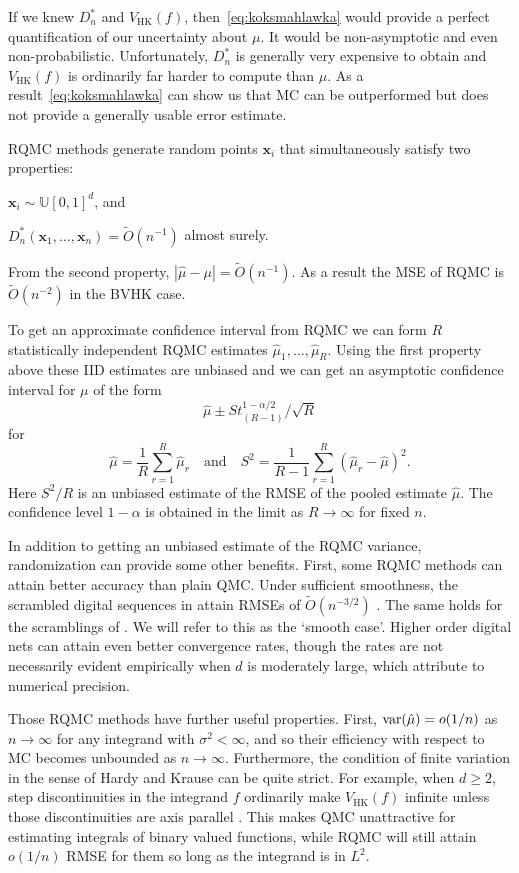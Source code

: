 \documentclass{article}
\renewcommand{\ge}{\geqslant}
\newcommand{\bsx}{\boldsymbol{x}}
\newcommand{\dunif}{\mathbb{U}}
\newcommand{\hk}{\mathrm{HK}}
\begin{document}
If we knew $D_n^*$ and $V_\hk(f)$, then~\eqref{eq:koksmahlawka} would provide a
perfect quantification of our uncertainty about $\mu$.
It would be non-asymptotic and even non-probabilistic.
Unfortunately, $D_n^*$ is generally very expensive
to obtain and $V_{\hk}(f)$ is ordinarily far harder
to compute than $\mu$. As a result~\eqref{eq:koksmahlawka}
can show us that MC can be outperformed but does
not provide a generally usable error estimate.

RQMC methods generate random points $\bsx_i$ that
simultaneously satisfy two properties:
\begin{compactenum}[\quad\bf1)]
\item $\bsx_i\sim\dunif[0,1]^d$, and
\item $D_n^*(\bsx_1,\dots,\bsx_n)=\tilde O(n^{-1})$ almost surely.
\end{compactenum}
From the second property, $|\hat\mu-\mu|=\tilde O(n^{-1})$.
As a result the MSE of RQMC is $\tilde O(n^{-2})$
in the BVHK case.

To get an approximate confidence interval from RQMC
we can form $R$ statistically independent RQMC estimates
$\hat\mu_1,\dots,\hat\mu_R$. Using the first property
above these IID estimates are unbiased and we can get
an asymptotic confidence interval for $\mu$ of the form
$$
\hat\mu \pm S t_{(R-1)}^{1-\alpha/2}/\sqrt{R}
$$
for
$$
\hat\mu = \frac1R\sum_{r=1}^R\hat\mu_r
\quad\text{and}\quad
S^2 = \frac1{R-1}\sum_{r=1}^R(\hat\mu_r-\hat\mu)^2.
$$
Here $S^2/R$ is an unbiased estimate of the RMSE
of the pooled estimate $\hat\mu$.
The confidence level $1-\alpha$ is obtained in
the limit as $R\to\infty$ \cite{naka:tuff:2024}
for fixed $n$.

In addition to getting an unbiased estimate of
the RQMC variance, randomization can provide
some other benefits.  First, some RQMC methods
can attain better accuracy than plain QMC.
Under sufficient smoothness, the scrambled  digital sequences
in \cite{Owe95} attain RMSEs of $\tilde O(n^{-3/2})$
\cite{Owe97,Owe08a}. The same holds for the scramblings
of \cite{Mat98}. We will refer to this as the `smooth case'.
Higher order digital nets \cite{Dic11a} can attain even
better convergence rates, though the rates are not
necessarily evident empirically when $d$ is moderately
large, which \cite{nuyens2010higher} attribute to numerical precision.

Those RQMC methods have further
useful properties.  First,  $\operatorname{var}(\hat\mu) = o(1/n)$ as $n\to\infty$
for any integrand with $\sigma^2<\infty$, and so their
efficiency with respect to MC becomes unbounded as $n\to\infty$.
Furthermore, the condition of finite
variation in the sense of Hardy and Krause can be quite
strict. For example, when $d\ge2$, step discontinuities in the integrand
$f$ ordinarily make $V_{\hk}(f)$ infinite unless those discontinuities
are axis parallel \cite{Owe05a}. This makes QMC
unattractive for estimating integrals of binary
valued functions, while RQMC will still attain
$o(1/n)$ RMSE for them so long as the integrand
is in $L^2$.
\end{document}
